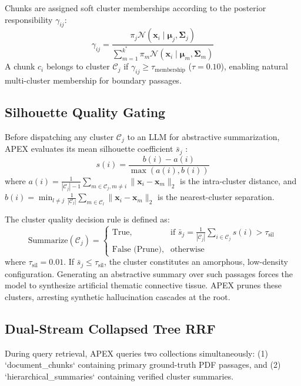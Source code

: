 \documentclass[11pt,a4paper]{article}
\begin{document}
Chunks are assigned soft cluster memberships according to the posterior responsibility $\gamma_{ij}$:
\begin{equation}
    \gamma_{ij} = \frac{\pi_j \mathcal{N}(\mathbf{x}_i \mid \boldsymbol{\mu}_j, \boldsymbol{\Sigma}_j)}{\sum_{m=1}^{k^*} \pi_m \mathcal{N}(\mathbf{x}_i \mid \boldsymbol{\mu}_m, \boldsymbol{\Sigma}_m)}
\end{equation}
A chunk $c_i$ belongs to cluster $\mathcal{C}_j$ if $\gamma_{ij} \ge \tau_{\text{membership}}$ ($\tau = 0.10$), enabling natural multi-cluster membership for boundary passages.

\subsection{Silhouette Quality Gating}
Before dispatching any cluster $\mathcal{C}_j$ to an LLM for abstractive summarization, APEX evaluates its mean silhouette coefficient $\bar{s}_j$ \cite{rousseeuw1987silhouettes}:
\begin{equation}
    s(i) = \frac{b(i) - a(i)}{\max(a(i), b(i))}
\end{equation}
where $a(i) = \frac{1}{|\mathcal{C}_j| - 1} \sum_{m \in \mathcal{C}_j, m \neq i} \|\mathbf{x}_i - \mathbf{x}_m\|_2$ is the intra-cluster distance, and $b(i) = \min_{l \neq j} \frac{1}{|\mathcal{C}_l|} \sum_{m \in \mathcal{C}_l} \|\mathbf{x}_i - \mathbf{x}_m\|_2$ is the nearest-cluster separation.

The cluster quality decision rule is defined as:
\begin{equation}
    \text{Summarize}(\mathcal{C}_j) = 
    \begin{cases} 
        \text{True}, & \text{if } \bar{s}_j = \frac{1}{|\mathcal{C}_j|} \sum_{i \in \mathcal{C}_j} s(i) > \tau_{\text{sil}} \\
        \text{False (Prune)}, & \text{otherwise}
    \end{cases}
\end{equation}
where $\tau_{\text{sil}} = 0.01$. If $\bar{s}_j \le \tau_{\text{sil}}$, the cluster constitutes an amorphous, low-density configuration. Generating an abstractive summary over such passages forces the model to synthesize artificial thematic connective tissue. APEX prunes these clusters, arresting synthetic hallucination cascades at the root.

\subsection{Dual-Stream Collapsed Tree RRF}
During query retrieval, APEX queries two collections simultaneously: (1) `document\_chunks` containing primary ground-truth PDF passages, and (2) `hierarchical\_summaries` containing verified cluster summaries.
\end{document}
